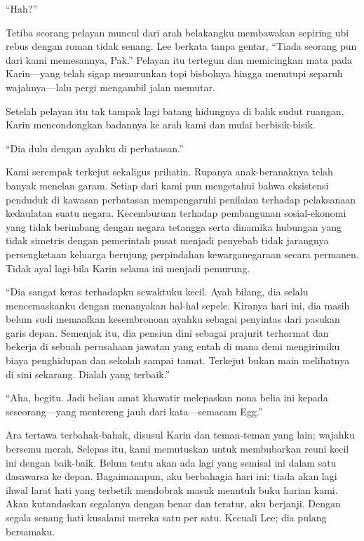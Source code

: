 \documentclass[smalldemyvopaper,11pt,twoside,onecolumn,openright,extrafontsizes]{memoir}
\begin{document}
``Hah?''


Tetiba seorang pelayan muncul dari arah belakangku membawakan sepiring ubi rebus dengan roman tidak senang. Lee berkata tanpa gentar, ``Tiada seorang pun dari kami memesannya, Pak.'' Pelayan itu tertegun dan memicingkan mata pada Karin---yang telah sigap menurunkan topi bisbolnya hingga menutupi separuh wajahnya---lalu pergi mengambil jalan memutar.

Setelah pelayan itu tak tampak lagi batang hidungnya di balik sudut ruangan, Karin mencondongkan badannya ke arah kami dan mulai berbisik-bisik.

``Dia dulu dengan ayahku di perbatasan.''


Kami serempak terkejut sekaligus prihatin. Rupanya anak-beranaknya telah banyak menelan garam. Setiap dari kami pun mengetahui bahwa eksistensi penduduk di kawasan perbatasan mempengaruhi penilaian terhadap pelaksanaan kedaulatan suatu negara. Kecemburuan terhadap pembangunan sosial-ekonomi yang tidak berimbang dengan negara tetangga serta dinamika hubungan yang tidak simetris dengan pemerintah pusat menjadi penyebab tidak jarangnya persengketaan keluarga berujung perpindahan kewarganegaraan secara permanen. Tidak ayal lagi bila Karin selama ini menjadi pemurung.

``Dia sangat keras terhadapku sewaktuku kecil. Ayah bilang, dia selalu mencemaskanku dengan menanyakan hal-hal sepele. Kiranya hari ini, dia masih belum sudi memaafkan kesembronoan ayahku sebagai penyintas dari pasukan garis depan. Semenjak itu, dia pensiun dini sebagai prajurit terhormat dan bekerja di sebuah perusahaan jawatan yang entah di mana demi mengirimiku biaya penghidupan dan sekolah sampai tamat. Terkejut bukan main melihatnya di sini sekarang. Dialah yang terbaik.''

``Aha, begitu. Jadi beliau amat khawatir melepaskan nona belia ini kepada seseorang---yang mentereng jauh dari kata---semacam Egg.''

Ara tertawa terbahak-bahak, disusul Karin dan teman-teman yang lain; wajahku bersemu merah. Selepas itu, kami memutuskan untuk membubarkan reuni kecil ini dengan baik-baik. Belum tentu akan ada lagi yang semisal ini dalam satu dasawarsa ke depan. Bagaimanapun, aku berbahagia hari ini; tiada akan lagi ihwal larat hati yang terbetik mendobrak masuk menutuh buku harian kami. Akan kutandaskan segalanya dengan benar dan teratur, aku berjanji. Dengan segala senang hati kusalami mereka satu per satu. Kecuali Lee; dia pulang bersamaku.
\end{document}
